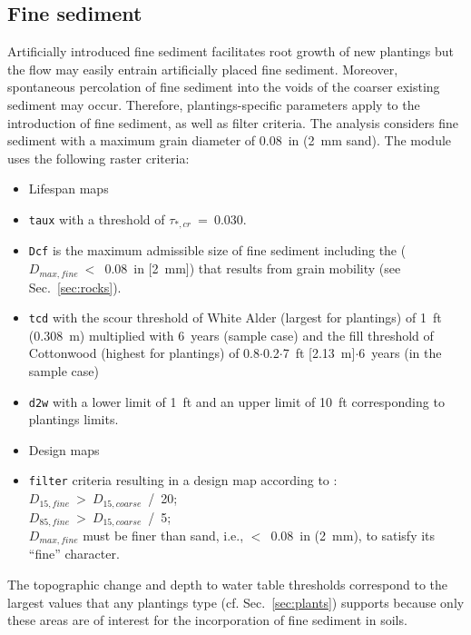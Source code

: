 \subsection{Fine sediment}\label{sec:finesed}
Artificially introduced fine sediment facilitates root growth of new plantings but the flow may easily entrain artificially placed fine sediment. Moreover, spontaneous percolation of fine sediment into the voids of the coarser existing sediment may occur. Therefore, plantings-specific parameters apply to the introduction of fine sediment, as well as filter criteria. The analysis considers fine sediment with a maximum grain diameter of 0.08~in (2~mm sand). The  module uses the following raster criteria:

\begin{itemize}
	\item[] Lifespan maps
	\item \texttt{taux} with a threshold of $\tau_{*,cr}$~=~0.030.
	\item \texttt{Dcf} is the maximum admissible size of fine sediment including the ($D_{max, fine}~<$~0.08~in [2~mm]) that results from grain mobility (see Sec.~\ref{sec:rocks}).
	\item \texttt{tcd} with the scour threshold of White Alder (largest for plantings) of 1~ft (0.308~m) multiplied with 6~years (sample case) and the fill threshold of Cottonwood (highest for plantings) of 0.8$\cdot$0.2$\cdot$7~ft [2.13~m]$\cdot$6~years (in the sample case)
	\item \texttt{d2w} with a lower limit of 1~ft and an upper limit of 10~ft corresponding to plantings limits.
	\item[] Design maps
	\item \texttt{filter} criteria resulting in a design map according to \citep{usace00}:\\
			$D_{15, fine}~>~D_{15, coarse}$~/~20;\\
			$D_{85, fine}~>~D_{15, coarse}$~/~5;\\
			$D_{max, fine}$ must be finer than sand, i.e., $<$~0.08~in (2~mm), to satisfy its ``fine'' character.
\end{itemize}

The topographic change and depth to water table thresholds correspond to the largest values that any plantings type (cf. Sec.~\ref{sec:plants}) supports because only these areas are of interest for the incorporation of fine sediment in soils.

